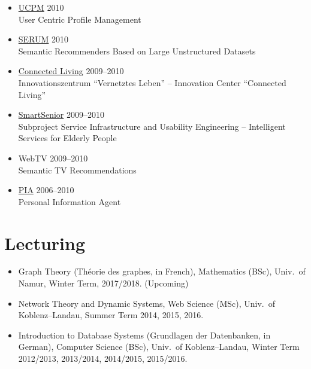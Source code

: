 \documentclass[line,mm]{res}
\newcounter{y}
\begin{document}
\begin{resume}
\begin{itemize}
\item \href{http://www.dai-labor.de/en/irml/ucpm/}{UCPM} \hfill 2010 \\
  User Centric Profile Management
\item \href{http://www.dai-labor.de/en/irml/serum/}{SERUM} \hfill 2010 \\
  Semantic Recommenders Based on Large Unstructured Datasets
\item \href{http://www.connected-living.org/}{Connected Living} \hfill 2009--2010 \\
   Innovationszentrum ``Vernetztes Leben'' -- Innovation Center ``Connected Living''
\item \href{http://www1.smart-senior.de/}{SmartSenior} \hfill 2009--2010 \\
  Subproject Service Infrastructure and Usability Engineering -- Intelligent Services for Elderly People
\item WebTV \hfill 2009--2010 \\
  Semantic TV Recommendations
\item \href{http://pia-services.de/}{PIA} \hfill 2006--2010 \\
  Personal Information Agent 
\end{itemize}

\section{Lecturing}
\begin{itemize}
\item Graph Theory (Théorie des graphes, in French), Mathematics (BSc),
  Univ.\ of Namur, Winter Term, 2017/2018.  (Upcoming)
\item Network Theory and Dynamic Systems, Web Science (MSc), Univ.\ of
  Koblenz--Landau, Summer Term 2014, 2015, 2016.   
\item Introduction to Database Systems (Grundlagen der Datenbanken, in
  German), Computer Science (BSc), Univ.\ of Koblenz--Landau, 
  Winter Term 2012/2013, 2013/2014, 2014/2015, 2015/2016.
\end{itemize}


\end{resume}
\end{document}
